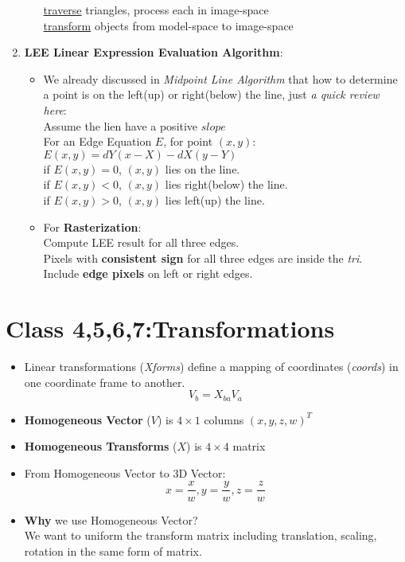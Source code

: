 \documentclass[geye, cyan,normal,en]{elegantnote}
\begin{document}
\begin{enumerate}
\begin{itemize}
		\underline{traverse} triangles, process each in image-space\\
		\underline{transform} objects from model-space to image-space
	\end{itemize}
	\item \textbf{LEE Linear Expression Evaluation Algorithm}:
	\begin{itemize}
		\item We already discussed in \textit{Midpoint Line Algorithm} that how to determine a point is on the left(up) or right(below) the line, just \textit{a quick review here}:\\
		Assume the lien have a positive $slope$\\
		For an Edge Equation $E$, for point $(x,y)$: $E(x,y)=dY(x-X)-dX(y-Y)$\\
		if $E(x,y)=0$, $(x,y)$ lies on the line.\\
		if $E(x,y)<0$, $(x,y)$ lies right(below) the line.\\
		if $E(x,y)>0$, $(x,y)$ lies left(up) the line.
		\item For \textbf{Rasterization}:\\
		Compute LEE result for all three edges.\\
		Pixels with \textbf{consistent sign} for all three edges are inside the \textit{tri}.\\
		Include \textbf{edge pixels} on left or right edges.
	\end{itemize}
\end{enumerate}

\section{Class 4,5,6,7:Transformations}
\begin{itemize}
	\item Linear transformations (\textit{Xforms}) define a mapping of coordinates (\textit{coords}) in one coordinate frame to another.
	$$V_b=X_{ba}V_a$$
	\item \textbf{Homogeneous Vector} ($V$) is $4\times 1$ columns $(x,y,z,w)^T$
	\item \textbf{Homogeneous Transforms} ($X$) is $4 \times 4$ matrix
	\item From Homogeneous Vector to 3D Vector:
	$$x=\frac{x}{w} , y=\frac{y}{w},z=\frac{z}{w}$$
	\item \textbf{Why} we use Homogeneous Vector?\\
	We want to uniform the transform matrix including translation, scaling, rotation in the same form of matrix.
\end{itemize}
\end{document}
